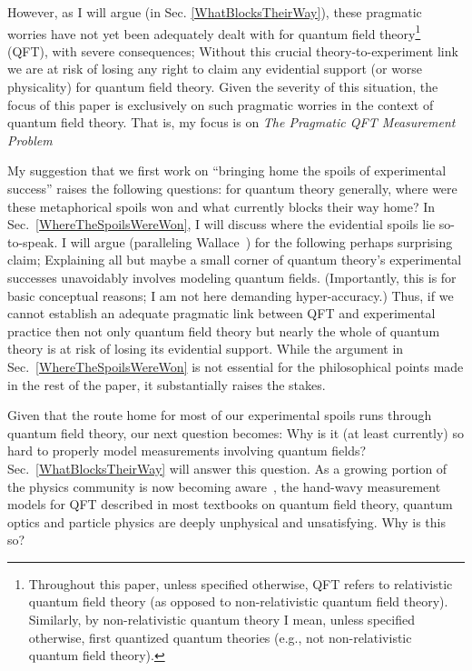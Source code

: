 \documentclass[12pt,prd,superscriptaddress,floatfix,amsmath,amssymb,amsfonts,nofootinbib]{revtex4-2}
\begin{document}
However, as I will argue (in Sec. \ref{WhatBlocksTheirWay}), these pragmatic worries have not yet been adequately dealt with for quantum field theory\footnote{Throughout this paper, unless specified otherwise, QFT refers to relativistic quantum field theory (as opposed to non-relativistic quantum field theory). Similarly, by non-relativistic quantum theory I mean, unless specified otherwise, first quantized quantum theories (e.g., not non-relativistic quantum field theory).} (QFT), with severe consequences; Without this crucial theory-to-experiment link we are at risk of losing any right to claim any evidential support (or worse physicality) for quantum field theory. Given the severity of this situation, the focus of this paper is exclusively on such pragmatic worries in the context of quantum field theory. That is, my focus is on \textit{The Pragmatic QFT Measurement Problem}

My suggestion that we first work on ``bringing home the spoils of experimental success'' raises the following questions: for quantum theory generally, where were these metaphorical spoils won and what currently blocks their way home? In Sec.~\ref{WhereTheSpoilsWereWon}, I will discuss where the evidential spoils lie so-to-speak. I will argue (paralleling Wallace~\cite{WallaceBlueSkyTalk,WallaceBlueSkyPaper}) for the following perhaps surprising claim; Explaining all but maybe a small corner of quantum theory's experimental successes unavoidably involves modeling quantum fields. (Importantly, this is for basic conceptual reasons; I am not here demanding hyper-accuracy.) Thus, if we cannot establish an adequate pragmatic link between QFT and experimental practice then not only quantum field theory but nearly the whole of quantum theory is at risk of losing its evidential support. While the argument in Sec.~\ref{WhereTheSpoilsWereWon} is not essential for the philosophical points made in the rest of the paper, it substantially raises the stakes.

Given that the route home for most of our experimental spoils runs through quantum field theory, our next question becomes: Why is it (at least currently) so hard to properly model measurements involving quantum fields? Sec.~\ref{WhatBlocksTheirWay} will answer this question.  As a growing portion of the physics community is now becoming aware~\cite{pologomez2021detectorbased,Jubb2022,BorstenJubbKells,fewster1,fewster2,fewster3,Anastopoulos2022,Sorkin,TaleOfTwo,Ruep2021,JoseMariaEdu,Redhead1995,Dowker,Dowker2,borsten,alvaro,Adam}, the hand-wavy measurement models for QFT described in most textbooks on quantum field theory, quantum optics and particle physics are deeply unphysical and unsatisfying. Why is this so?
\end{document}
